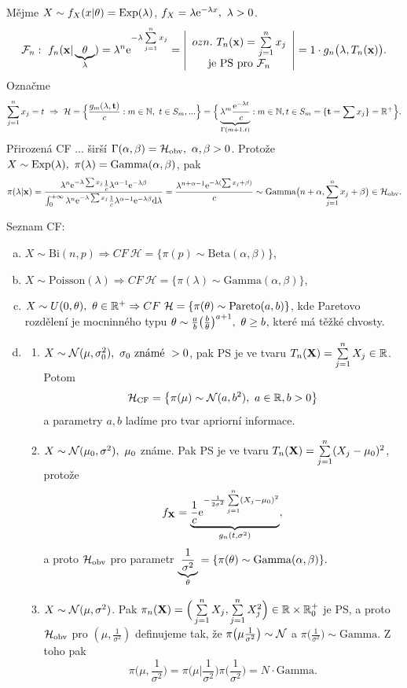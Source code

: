 \begin{example}
	Mějme $X\sim f_X(x|\theta)=\mathrm{Exp}(\lambda)$, $f_X=\lambda\mathrm{e}^{-\lambda x},~\lambda>0$. $$\mathcal{F}_n: ~f_n(\textbf{x}|\underbrace{\theta}_{\lambda})=\lambda^n\mathrm{e}^{-\lambda\sum\limits_{j=1}^{n} x_j}=\left|\begin{array}{c}
	ozn.~T_n(\textbf{x})=\sum\limits_{j=1}^{n} x_j\\\text{je PS pro }\mathcal{F}_n
\end{array}
\right|=1\cdot g_n\big(\lambda,T_n(\textbf{x})\big).$$
Označme $$\sum\limits_{j=1}^{n} x_j=t~\Rightarrow~\mathcal{H}=\Big\{ \frac{g_m(\lambda,\textbf{t})}{c}:m\in\mathbb{N},~t\in S_m,... \Big\}=\Big\{\underbrace{\lambda^m\frac{\mathrm{e}^{-\lambda t}}{c}}_{\Gamma(m+1,t)}:m\in\mathbb{N},t\in S_m=\{\textbf{t}=\sum x_j \}=\mathbb{R}^+\Big\}.$$
Přirozená CF ... širší $\Gamma(\alpha,\beta)=\mathcal{H}_\text{obv} ,~\alpha,\beta>0$.
Protože $X\sim\mathrm{Exp}(\lambda),~\pi(\lambda)=\mathrm{Gamma}(\alpha,\beta)$, pak 
$$ \pi(\lambda|\textbf{x})=\frac{\lambda^n\mathrm{e}^{-\lambda\sum x_j}\frac{1}{c}\lambda^{\alpha-1}\mathrm{e}^{-\lambda\beta}}{\int_{0}^{+\infty}\lambda^n\mathrm{e}^{-\lambda\sum x_j}\frac{1}{c}\lambda^{\alpha-1}\mathrm{e}^{-\lambda\beta}\mathrm{d}\lambda}=\frac{\lambda^{n+\alpha-1}\mathrm{e}^{-\lambda(\sum x_j+\beta)}}{c}\sim\mathrm{Gamma}\big(n+\alpha,\sum\limits_{j=1}^{n} x_j+\beta\big)\in\mathcal{H}_\text{obv} .$$

Seznam CF: \begin{enumerate}[a)]
	\item $X\sim \mathrm{Bi}(n,p)\Rightarrow CF~\mathcal{H}=\{\pi(p)\sim\mathrm{Beta}(\alpha,\beta)\}$,
	\item $X\sim\mathrm{Poisson}(\lambda)\Rightarrow CF~\mathcal{H}=\{\pi(\lambda)\sim\mathrm{Gamma}(\alpha,\beta)\}$,
	\item $X\sim U(0,\theta),~\theta\in\mathbb{R}^+\Rightarrow CF~\mathcal{H}=\{\pi(\theta)\sim\mathrm{Pareto}(a,b)\}$, kde Paretovo rozdělení je mocninného typu $\theta\sim\frac{a}{b}\big(\frac{b}{\theta}\big)^{a+1},~\theta\geq b$, které má těžké chvosty.
	\item \begin{enumerate}[1)]
		\item $X\sim \mathcal{N}(\mu,\sigma_0^2),~\sigma_0\text{ známé }>0$, pak PS je ve tvaru $T_n(\textbf{X})=\sum\limits_{j=1}^{n} X_j\in\mathbb{R}$. Potom $$\mathcal{H}_\mathrm{CF}=\big\{\pi(\mu)\sim\mathcal{N}(a,b^2),~a\in\mathbb{R},b>0\big\}$$ a parametry $a,b$ ladíme pro tvar apriorní informace.
		\item $X\sim\mathcal{N}(\mu_0,\sigma^2),~\mu_0$ známe. Pak PS je ve tvaru $T_n(\textbf{X})=\sum\limits_{j=1}^{n}(X_j-\mu_0)^2$, protože 
		$$ f_{\textbf{X}}=\underbrace{\frac{1}{c}\mathrm{e}^{-\frac{1}{2\sigma^2}\sum\limits_{j=1}^{n}(X_j-\mu_0)^2}}_{g_n(t,\sigma^2)},$$ a proto $\mathcal{H}_\text{obv}$ pro parametr $\underbrace{\frac{1}{\sigma^2}}_{\theta}=\{\pi(\theta)\sim\mathrm{Gamma}(\alpha,\beta)\}.$
		\item $X\sim\mathcal{N}(\mu,\sigma^2)$. Pak $\pi_n(\textbf{X})=\Big(\sum\limits_{j=1}^{n} X_j,\sum\limits_{j=1}^{n} X_j^2\Big)\in\mathbb{R}\times\mathbb{R}_0^+$ je PS, a proto
		$\mathcal{H}_\text{obv}$ pro $(\mu,\frac{1}{\sigma^2})$ definujeme tak, že $\pi\big(\mu\frac{
		1}{\sigma^2}\big)\sim\mathcal{N}$ a $\pi\big(\frac{1}{\sigma^2}\big)\sim\mathrm{Gamma}$. Z toho pak 
		$$ \pi\big(\mu,\frac{1}{\sigma^2}\big)=\pi\big(\mu|\frac{1}{\sigma^2}\big)\pi\big(\frac{1}{\sigma^2}\big)=N\cdot\mathrm{Gamma}.$$
	\end{enumerate}
\end{enumerate}
\end{example}
